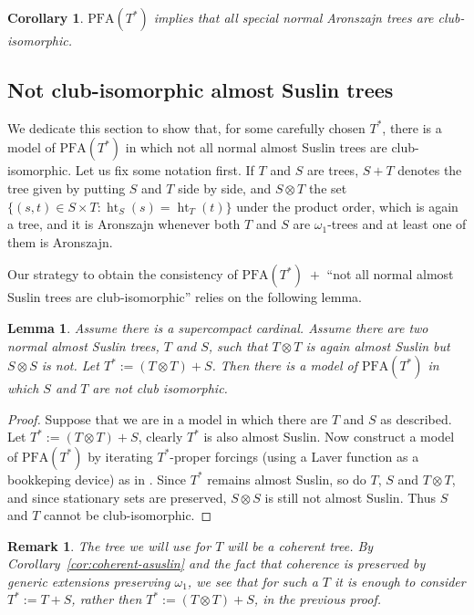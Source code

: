 \documentclass{amsart}
\newtheorem{corollary}[theorem]{Corollary}
\newtheorem{lemma}[theorem]{Lemma}
\newtheorem{rmk}[theorem]{Remark}
\theoremstyle{definition}
\newcommand{\PFA}{\mathrm{PFA}}
\DeclareMathOperator{\hht}{ht}
\begin{document}
\begin{corollary}\label{cor:special-iso}
  $\PFA(T^{*})$ implies that
  all special normal Aronszajn trees are club-isomorphic.
\end{corollary}


\subsection{Not club-isomorphic almost Suslin trees}
We dedicate this section to show that, for some carefully chosen $T^*$, there is a model  of $\PFA(T^{*})$ in which
not all normal almost Suslin trees are club-isomorphic.  Let us fix
some notation first. If $T$ and $S$ are trees, $S + T$ denotes the
tree given by putting $S$ and $T$ side by side, and $S \otimes T$ the
set $\{(s,t) \in S \times T : \hht_{S}(s) = \hht_{T}(t)\}$ under the
product order, which is again a tree, and it is Aronszajn whenever
both $T$ and $S$ are $\omega_{1}$-trees and at least one of them is
Aronszajn.

Our strategy to obtain the consistency of
$\PFA(T^{*}) \; +$
``not all normal almost Suslin trees are club-isomorphic''
relies on the following lemma.

\begin{lemma}\label{lem:con-reduction}
  Assume there is a supercompact cardinal.
  Assume there are two normal almost Suslin trees, $T$ and $S$, such that
  $T \otimes T$ is again almost Suslin but $S \otimes S$ is not.
  Let $T^*:=(T\otimes T)+S$. Then there is a model of
  $\PFA(T^{*})$ in which $S$ and $T$ are not club isomorphic.
\end{lemma}
\begin{proof}
  Suppose that we are in a model in which there are $T$ and $S$
  as described. Let $T^{*} := (T \otimes T) + S$, clearly $T^{*}$ is also
  almost Suslin. Now construct a model of $\PFA(T^{*})$ by iterating
  $T^{*}$-proper forcings (using a Laver function as a bookkeping device)
  as in \cite{Krueger2020}. Since $T^{*}$ remains
  almost Suslin, so do $T$, $S$ and $T \otimes T$, and since stationary
  sets are preserved, $S \otimes S$ is still not almost Suslin. Thus $S$
  and $T$ cannot be club-isomorphic.
\end{proof}

\begin{rmk}\label{rmk:sum-is-enough}
  The tree we will use for $T$ will be a coherent tree. By
  Corollary~\ref{cor:coherent-asuslin} and the fact that coherence is
  preserved by generic extensions preserving $\omega_{1}$, we see that for such
  a $T$ it is enough to consider $T^{*} := T + S$, rather then $T^{*} :=
  (T \otimes T) + S$, in the previous proof.
\end{rmk}
\end{document}
